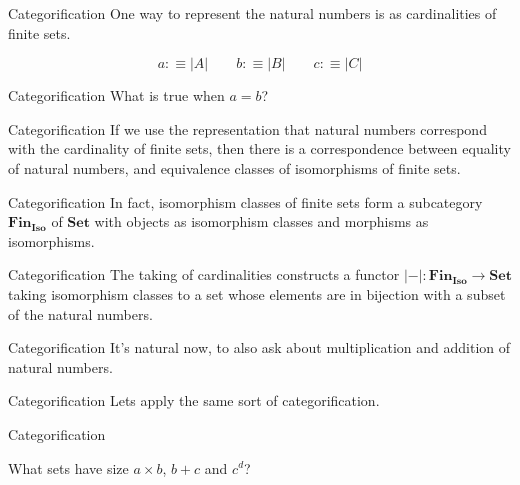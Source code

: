\documentclass[tikz]{beamer}
\theoremstyle{definition}
\newcommand{\cat}[1]{\mathbf{#1}}
\begin{document}
\begin{frame}{Categorification}
One way to represent the natural numbers is as cardinalities of finite sets.

\begin{center}
        \begin{equation*}
            a :\equiv |A| \qquad b :\equiv |B| \qquad c :\equiv |C|
        \end{equation*}
\end{center}
\end{frame}

\begin{frame}{Categorification}
What is true when $a = b$?
\end{frame}

\begin{frame}{Categorification}
If we use the representation that natural numbers correspond with the cardinality of finite sets,
then there is a correspondence between equality of natural numbers, and equivalence classes of isomorphisms of
finite sets.
\end{frame}

\begin{frame}{Categorification}
In fact, isomorphism classes of finite sets form a subcategory  $\cat{Fin_{Iso}}$ of $\cat{Set}$ with objects as isomorphism classes and morphisms as isomorphisms.
\end{frame}

\begin{frame}{Categorification}
The taking of cardinalities constructs a functor $|-|\colon \cat{Fin_{Iso}} \to \cat{Set}$ taking isomorphism classes to a set whose elements are in bijection with a subset of the natural numbers.
\end{frame}

\begin{frame}{Categorification}
    It's natural now, to also ask about multiplication and addition of natural numbers.
\end{frame}

\begin{frame}{Categorification}
    Lets apply the same sort of categorification.

\end{frame}

\begin{frame}{Categorification}

What sets have size $a \times b$,  $b + c$ and $c^d$?

\end{frame}{}
\end{document}
